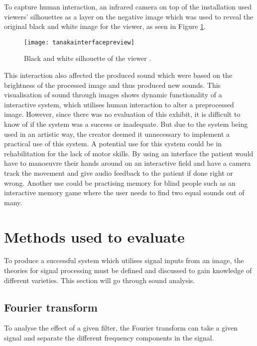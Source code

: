 To capture human interaction, an infrared camera on top of the installation used viewers' silhouettes as a layer on the negative image which was used to reveal the original black and white image for the viewer, as seen in Figure \ref{fig:tanakainterfacepreview}.

\begin{figure}[!h]
\centering
\texttt{[image: tanakainterfacepreview]}
\caption{\label{fig:tanakainterfacepreview}Black and white silhouette of the viewer \cite{Tanaka2012}.}
\end{figure}

This interaction also affected the produced sound which were based on the brightness of the processed image and thus produced new sounds. This visualisation of sound through images shows dynamic functionality of a interactive system, which utilises human interaction to alter a preprocessed image. However, since there was no evaluation of this exhibit, it is difficult to know of if the system was a success or inadequate. But due to the system being used in an artistic way, the creator deemed it unnecessary to implement a practical use of this system. A potential use for this system could be in rehabilitation for the lack of motor skills. By using an interface the patient would have to manoeuvre their hands around on an interactive field and have a camera track the movement and give audio feedback to the patient if done right or wrong. Another use could be practising memory for blind people such as an interactive memory game where the user needs to find two equal sounds out of many. 

\section{Methods used to evaluate}\label{sec:methodsusedtoevaluate}

To produce a successful system which utilises signal inputs from an image, the theories for signal processing must be defined and discussed to gain knowledge of different varieties. This section will go through sound analysis.

\subsection{Fourier transform}\label{sub:fourier}

To analyse the effect of a given filter, the Fourier transform can take a given signal and separate the different frequency components in the signal.

